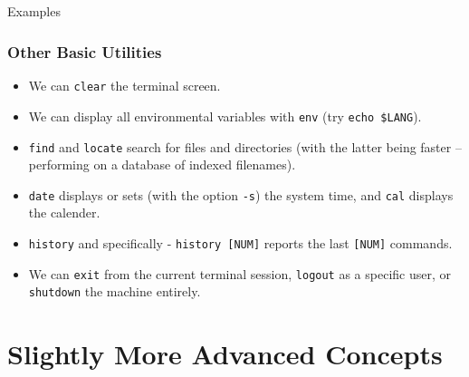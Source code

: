 \documentclass[10pt]{beamer}
\begin{document}
\subsection{}
\begin{frame}[fragile]{Examples}
\frametitle{Other Basic Utilities}
\begin{itemize}
\item We can \texttt{clear} the terminal screen.\vspace{0.1in}
\item We can display all environmental variables with \texttt{env} (try \texttt{echo \$LANG}).\vspace{0.1in}
\item \texttt{find} and \texttt{locate} search for files and directories (with the latter being faster -- performing on a database of indexed filenames).\vspace{0.1in}
\item  \texttt{date} displays or sets (with the option \texttt{-s}) the system time, and \texttt{cal} displays the calender.\vspace{0.1in}
\item \texttt{history} and specifically - \texttt{history [NUM]} reports the last \texttt{[NUM]} commands.\vspace{0.1in}
\item We can \texttt{exit} from the current terminal session, \texttt{logout} as a specific user, or \texttt{shutdown} the machine entirely.
\end{itemize}
\end{frame}

\section{Slightly More Advanced Concepts}
\end{document}

